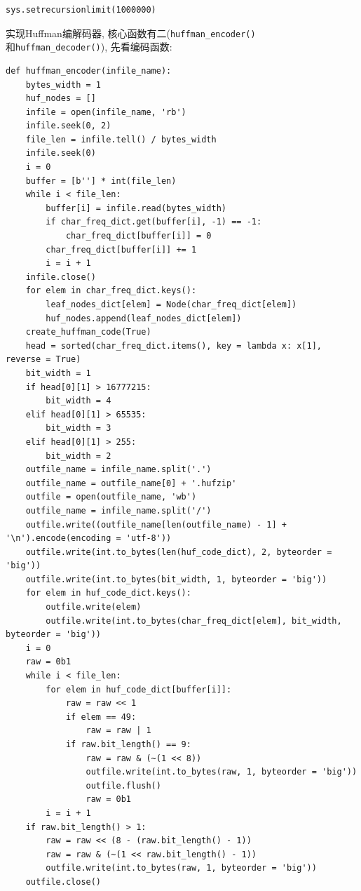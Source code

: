 \documentclass{ctexart}
\begin{document}
{\setmainfont{Courier New Bold}              
\begin{lstlisting}
sys.setrecursionlimit(1000000)
\end{lstlisting}}

实现Huffman编解码器, 核心函数有二(\texttt{huffman\_encoder()}\\和\texttt{huffman\_decoder()}), 先看编码函数:

{\setmainfont{Courier New Bold}              
\begin{lstlisting}
def huffman_encoder(infile_name):
    bytes_width = 1
    huf_nodes = []
    infile = open(infile_name, 'rb')
    infile.seek(0, 2)
    file_len = infile.tell() / bytes_width
    infile.seek(0)
    i = 0
    buffer = [b''] * int(file_len)
    while i < file_len:
        buffer[i] = infile.read(bytes_width)
        if char_freq_dict.get(buffer[i], -1) == -1:
            char_freq_dict[buffer[i]] = 0
        char_freq_dict[buffer[i]] += 1
        i = i + 1
    infile.close()
    for elem in char_freq_dict.keys():
        leaf_nodes_dict[elem] = Node(char_freq_dict[elem])
        huf_nodes.append(leaf_nodes_dict[elem])
    create_huffman_code(True)
    head = sorted(char_freq_dict.items(), key = lambda x: x[1], reverse = True)
    bit_width = 1
    if head[0][1] > 16777215:
        bit_width = 4
    elif head[0][1] > 65535:
        bit_width = 3
    elif head[0][1] > 255:
        bit_width = 2
    outfile_name = infile_name.split('.')
    outfile_name = outfile_name[0] + '.hufzip'
    outfile = open(outfile_name, 'wb')
    outfile_name = infile_name.split('/')
    outfile.write((outfile_name[len(outfile_name) - 1] + '\n').encode(encoding = 'utf-8'))
    outfile.write(int.to_bytes(len(huf_code_dict), 2, byteorder = 'big'))
    outfile.write(int.to_bytes(bit_width, 1, byteorder = 'big'))
    for elem in huf_code_dict.keys():
        outfile.write(elem)
        outfile.write(int.to_bytes(char_freq_dict[elem], bit_width, byteorder = 'big'))
    i = 0
    raw = 0b1
    while i < file_len:
        for elem in huf_code_dict[buffer[i]]:
            raw = raw << 1
            if elem == 49:
                raw = raw | 1
            if raw.bit_length() == 9:
                raw = raw & (~(1 << 8))
                outfile.write(int.to_bytes(raw, 1, byteorder = 'big'))
                outfile.flush()
                raw = 0b1
        i = i + 1
    if raw.bit_length() > 1:
        raw = raw << (8 - (raw.bit_length() - 1))
        raw = raw & (~(1 << raw.bit_length() - 1))
        outfile.write(int.to_bytes(raw, 1, byteorder = 'big'))
    outfile.close()
\end{lstlisting}}
\end{document}
